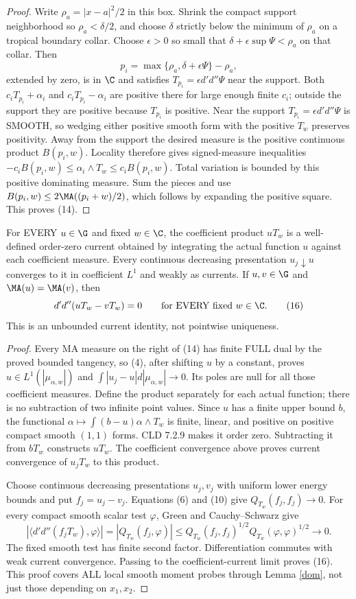 \begin{proof}
Write $\rho_a=|x-a|^2/2$ in this box. Shrink the compact support neighborhood
so $\rho_a<\delta/2$, and choose $\delta$ strictly below the minimum of
$\rho_a$ on a tropical boundary collar. Choose $\epsilon>0$ so small that
$\delta+\epsilon\sup\Psi<\rho_a$ on that collar. Then
\[
 p_i=\max\{\rho_a,\delta+\epsilon\Psi\}-\rho_a,
\]
extended by zero, is in $\C$ and satisfies
$T_{p_i}=\epsilon d'd''\Psi$ near the support. Both
$c_iT_{p_i}+\alpha_i$ and $c_iT_{p_i}-\alpha_i$ are positive there for
large enough finite $c_i$; outside the support they are positive because
$T_{p_i}$ is positive. Near the support $T_{p_i}=\epsilon d'd''\Psi$ is SMOOTH,
so wedging either positive smooth form with the positive $T_w$ preserves
positivity. Away from the support the desired measure is the positive
continuous product $B(p_i,w)$. Locality therefore gives signed-measure inequalities
$-c_iB(p_i,w)\le\alpha_i\wedge T_w\le c_iB(p_i,w)$.
Total variation is bounded by this positive dominating measure. Sum the
pieces and use
$B(p_i,w)\le2\MA((p_i+w)/2)$, which follows by expanding the positive
square. This proves (14).
\end{proof}

\begin{theorem}\label{unbounded}
For EVERY $u\in\G$ and fixed $w\in\C$, the coefficient product $uT_w$
is a well-defined order-zero current obtained by integrating the actual
function $u$ against each coefficient measure. Every continuous decreasing
presentation $u_j\downarrow u$ converges to it in coefficient $L^1$ and
weakly as currents. If $u,v\in\G$ and $\MA(u)=\MA(v)$, then
\[
 d'd''(uT_w-vT_w)=0\qquad\hbox{for EVERY fixed }w\in\C.    \tag{16}
\]
This is an unbounded current identity, not pointwise uniqueness.
\end{theorem}
\begin{proof}
Every MA measure on the right of (14) has finite FULL dual by the proved
bounded tangency, so (4), after shifting $u$ by a constant, proves
$u\in L^1(|\mu_{\alpha,w}|)$ and
$\int|u_j-u|d|\mu_{\alpha,w}|\to0$. Its poles are null for all those
coefficient measures. Define the product separately for each actual function;
there is no subtraction of two infinite point values.
Since $u$ has a finite upper bound $b$, the functional
$\alpha\mapsto\int(b-u)\alpha\wedge T_w$ is finite, linear, and positive
on positive compact smooth $(1,1)$ forms. CLD 7.2.9 makes it order zero.
Subtracting it from $bT_w$ constructs $uT_w$. The coefficient convergence
above proves current convergence of $u_jT_w$ to this product.

Choose continuous decreasing presentations $u_j,v_j$ with uniform lower
energy bounds and put $f_j=u_j-v_j$.
Equations (6) and (10) give $Q_{T_w}(f_j,f_j)\to0$.
For every compact smooth scalar test $\varphi$, Green and Cauchy--Schwarz give
\[
 |\langle d'd''(f_jT_w),\varphi\rangle|
 =|Q_{T_w}(f_j,\varphi)|
 \le Q_{T_w}(f_j,f_j)^{1/2}Q_{T_w}(\varphi,\varphi)^{1/2}
 \longrightarrow0.
\]
The fixed smooth test has finite second factor. Differentiation commutes with
weak current convergence. Passing to the coefficient-current limit proves
(16). This proof covers ALL local smooth moment probes through Lemma
\ref{dom}, not just those depending on $x_1,x_2$.
\end{proof}

